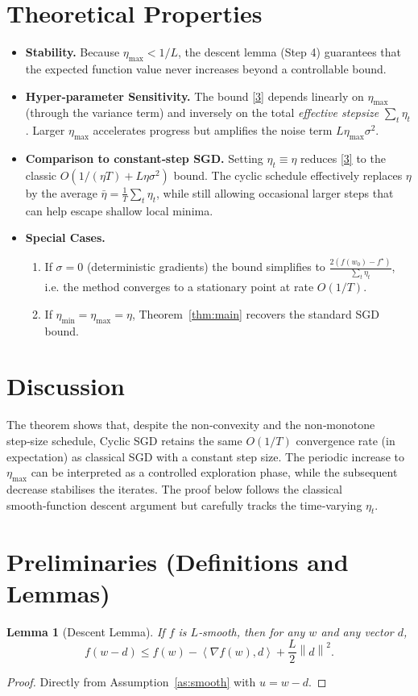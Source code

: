 \documentclass[11pt]{article}
\newtheorem{lemma}{Lemma}
\newcommand{\norm}[1]{\left\lVert #1 \right\rVert}
\newcommand{\inner}[2]{\left\langle #1,#2 \right\rangle}
\begin{document}
\section*{Theoretical Properties}
\begin{itemize}[leftmargin=*]
\item \textbf{Stability.} Because $\eta_{\max}<1/L$, the descent lemma (Step 4) guarantees that the expected function value never increases beyond a controllable bound.
\item \textbf{Hyper‑parameter Sensitivity.} The bound \eqref{3} depends linearly on $\eta_{\max}$ (through the variance term) and inversely on the total \emph{effective stepsize} $\sum_{t}\eta_t$.  Larger $\eta_{\max}$ accelerates progress but amplifies the noise term $L\eta_{\max}\sigma^2$.
\item \textbf{Comparison to constant‑step SGD.} Setting $\eta_t\equiv\eta$ reduces \eqref{3} to the classic $O(1/(\eta T)+L\eta\sigma^2)$ bound.  The cyclic schedule effectively replaces $\eta$ by the average $\bar\eta=\frac{1}{T}\sum_{t}\eta_t$, while still allowing occasional larger steps that can help escape shallow local minima.
\item \textbf{Special Cases.}
  \begin{enumerate}
  \item If $\sigma=0$ (deterministic gradients) the bound simplifies to
        $\frac{2(f(w_0)-f^{\star})}{\sum_{t}\eta_t}$, i.e. the method converges to a stationary point at rate $O(1/T)$.
  \item If $\eta_{\min}=\eta_{\max}=\eta$, Theorem~\ref{thm:main} recovers the standard SGD bound.
  \end{enumerate}
\end{itemize}

\section*{Discussion}
The theorem shows that, despite the non‑convexity and the non‑monotone step‑size schedule, Cyclic SGD retains the same $O(1/T)$ convergence rate (in expectation) as classical SGD with a constant step size.  The periodic increase to $\eta_{\max}$ can be interpreted as a controlled exploration phase, while the subsequent decrease stabilises the iterates.  The proof below follows the classical smooth‑function descent argument but carefully tracks the time‑varying $\eta_t$.

\newpage

\section*{Preliminaries (Definitions and Lemmas)}
\begin{lemma}[Descent Lemma]\label{lem:descent}
If $f$ is $L$‑smooth, then for any $w$ and any vector $d$,
\[
f(w-d)\le f(w)-\inner{\nabla f(w)}{d}+\frac{L}{2}\norm{d}^2 .
\]
\end{lemma}
\begin{proof}
Directly from Assumption~\ref{as:smooth} with $u=w-d$.
\end{proof}
\end{document}
